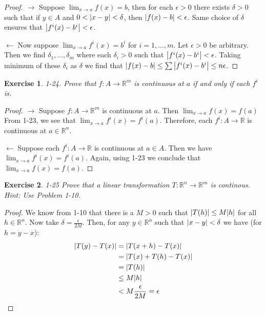 \documentclass[12pt]{book}
\newcommand\T{\rule{0pt}{2.6ex}}
\newcommand\B{\rule[-1.2ex]{0pt}{0pt}}
\newtheorem*{exercise*}{Exercise}
\begin{document}
\begin{proof}
  \T\B $\rightarrow$ Suppose $\lim_{x \to a} f(x) = b$, then for each $\epsilon > 0$ there exists $\delta > 0$ such that if $y \in A$ and $0 < \abs{x-y} < \delta $, then $\abs{f(x) -b } < \epsilon$. Same choice of $\delta $ ensures that $\abs{f^i(x) -b^i} < \epsilon$. 


  \T\B $\leftarrow$ Now suppose $\lim_{x \to a} f^i(x)= b^i$ for $i = 1,\ldots, m$. Let $\epsilon > 0$ be arbitrary. Then we find $\delta_1, \ldots, \delta_m$ where each $\delta_i > 0$ such that $ \abs{f^i(x) -b^i} < \epsilon$. Taking minimum of these $\delta_i$ as $\delta$ we find that $\abs{f(x) -b } \le \sum \abs{f^i(x) -b^i} \le n\epsilon$. 
\end{proof}

\begin{exercise*}
  1-24. Prove that $f: A \to \mathbb{R}^m$ is continuous at $a$ if and only if each $f^i$ is. 
\end{exercise*}

\begin{proof}
  \T\B $\rightarrow$  Suppose $f : A \to \mathbb{R}^m$ is continuous at $a$. Then $\lim_{x \to a}f(x) = f(a)$ From 1-23, we see that $\lim_{x \to a}f^i(x) = f^i(a)$.  Therefore, each $f^i: A \to \mathbb{R}$ is continuous at $a \in \mathbb{R}^n$.

  \T\B $\leftarrow$ Suppose each $f^i: A \to \mathbb{R}$ is continuous at $a \in A$. Then we have $\lim_{x \to a}f^i(x) = f^i(a)$. Again, using 1-23 we conclude that $\lim_{x \to a}f(x) = f(a)$. 
\end{proof}

\begin{exercise*}
  1-25 Prove that a linear transformation $T : \mathbb{R}^n \to \mathbb{R}^m$ is continous. Hint: Use Problem 1-10.
\end{exercise*}

\begin{proof}
  We know from 1-10 that there is a $M > 0$ such that $\abs{T(h)} \le M\abs{h}$ for all $h \in \mathbb{R}^n$. Now take $\delta = \frac{\epsilon}{2M}$. Then, for any $y \in \mathbb{R}^n$ such that $\abs{x -y } < \delta$ we have (for $h = y-x$):
  \begin{align*}
    \abs{T(y) - T(x)} &= \abs{T(x+h) - T(x)}\\
    &= \abs{T(x) + T(h) - T(x)} \\
    &= \abs{T(h)}\\
    & \le M\abs{h}\\
    & < M \frac{\epsilon}{2M} = \epsilon
  \end{align*}
\end{proof}
\end{document}
